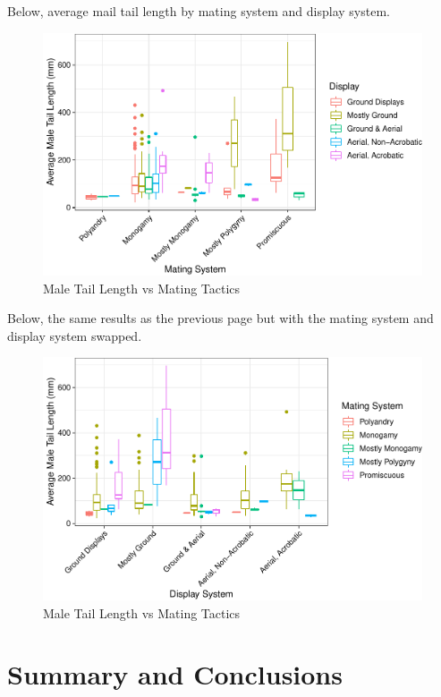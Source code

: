 \documentclass[
  12pt,
]{article}
\begin{document}
Below, average mail tail length by mating system and display system.

\begin{figure}
\centering
\includegraphics{Project_Code_files/figure-latex/q-2-plots-1.pdf}
\caption{Male Tail Length vs Mating Tactics}
\end{figure}

\newpage

Below, the same results as the previous page but with the mating system
and display system swapped.

\begin{figure}
\centering
\includegraphics{Project_Code_files/figure-latex/q-2-plots2-1.pdf}
\caption{Male Tail Length vs Mating Tactics}
\end{figure}

\newpage

\hypertarget{summary-and-conclusions}{%
\section{Summary and Conclusions}\label{summary-and-conclusions}}
\end{document}
